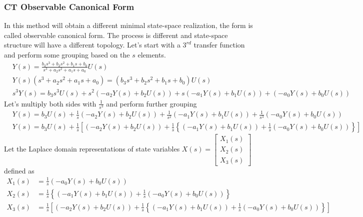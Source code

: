 \documentclass[twoside]{article}
\begin{document}
\subsubsection{CT Observable Canonical Form}

In this method will obtain a different minimal state-space realization,
the form is called observable canonical form.
The process is different and state-space structure will have a
different topology. Let's start with a $3^{rd}$ transfer function 
and perform some grouping based on the $s$ elements.
%
\begin{align*}
&Y(s) = \frac{ b_3 s^3 + b_2 s^2  + b_1 s + b_0 }{ s^3 + a_2 s^2 + a_1 s + a_0} U(s)
\\
&Y(s) \left( s^3 + a_2 s^2 + a_1 s + a_0 \right) = \left( b_3 s^3 + b_2 s^2  + b_1 s + b_0 \right) U(s)
\\
&s^3 Y(s) = b_3 s^3 U(s) + s^2 \left( -a_2 Y(s) + b_2 U(s) \right) + s \left( -a_1 Y(s) + b_1 U(s) \right) + 
\left( -a_0 Y(s) + b_0 U(s) \right) 
\end{align*}
%
Let's multiply both sides with $\frac{1}{s^3}$ and perform further grouping
%
\begin{align*}
&Y(s) = b_3 U(s) + \frac{1}{s} \left( -a_2 Y(s) + b_2 U(s) \right) + \frac{1}{s^2}  \left( -a_1 Y(s) + b_1 U(s) \right) + 
\frac{1}{s^3} \left( -a_0 Y(s) + b_0 U(s) \right) 
\\
&Y(s) = b_3 U(s) + \frac{1}{s} \left[ \left( -a_2 Y(s) + b_2 U(s) \right) + \frac{1}{s}  \left\lbrace \left( -a_1 Y(s) + b_1 U(s) \right) + 
\frac{1}{s} \left( -a_0 Y(s) + b_0 U(s) \right) \right\rbrace \right]
\end{align*}
%
Let the Laplace domain representations of state variables $X(s) = \left[ \begin{array}{c} X_1(s) \\ X_2(s) \\ X_3(s) \end{array} \right]$ defined as 
%
\begin{align*}
X_1(s) &= \frac{1}{s} \left( -a_0 Y(s) + b_0 U(s) \right)
\\
X_2(s) &= \frac{1}{s}  \left\lbrace \left( -a_1 Y(s) + b_1 U(s) \right) + 
\frac{1}{s} \left( -a_0 Y(s) + b_0 U(s) \right) \right\rbrace
\\
X_3(s) &= \frac{1}{s} \left[ \left( -a_2 Y(s) + b_2 U(s) \right) + \frac{1}{s}  \left\lbrace \left( -a_1 Y(s) + b_1 U(s) \right) + 
\frac{1}{s} \left( -a_0 Y(s) + b_0 U(s) \right) \right\rbrace \right]
\end{align*}
\end{document}
